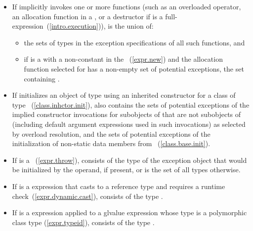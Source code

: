\begin{itemize}
\item
If  implicitly invokes one or more functions
(such as an overloaded operator,
an allocation function in a ,
or a destructor if  is a full-expression~(\ref{intro.execution})),
 is the union of:
\begin{itemize}
\item
the sets of types in the exception specifications of all such functions, and
\item
if  is a 
with a non-constant 
in the ~(\ref{expr.new})
and the allocation function selected for 
has a non-empty set of potential exceptions,
the set containing .
\end{itemize}
\item
If  initializes an object of type  using an inherited
constructor for a class of type ~(\ref{class.inhctor.init}),
 also contains the sets of potential exceptions
of the implied constructor invocations for subobjects of 
that are not subobjects of  (including default argument expressions
used in such invocations) as selected by overload resolution,
and the sets of potential exceptions of
the initialization of non-static data members from
~(\ref{class.base.init}).
\item
If  is a ~(\ref{expr.throw}),
 consists of the type of the exception object that would be
initialized by the operand, if present, or is the set of all types otherwise.
\item
If  is a  expression that casts to a reference type and
requires a runtime check~(\ref{expr.dynamic.cast}),
 consists of the type .
\item
If  is a  expression applied to a glvalue expression whose
type is a polymorphic class type (\ref{expr.typeid}),
 consists of the type .
\end{itemize}

